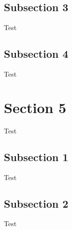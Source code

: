\documentclass[compress,14pt,t]{beamer}
\begin{document}
    \subsection{Subsection 3}
    \begin{frame}Test\end{frame}
    \subsection{Subsection 4}
    \begin{frame}Test\end{frame}

    \section{Section 5}
    \begin{frame}Test\end{frame}
    \subsection{Subsection 1}
    \begin{frame}Test\end{frame}
    \subsection{Subsection 2}
    \begin{frame}Test\end{frame}
\end{document}
